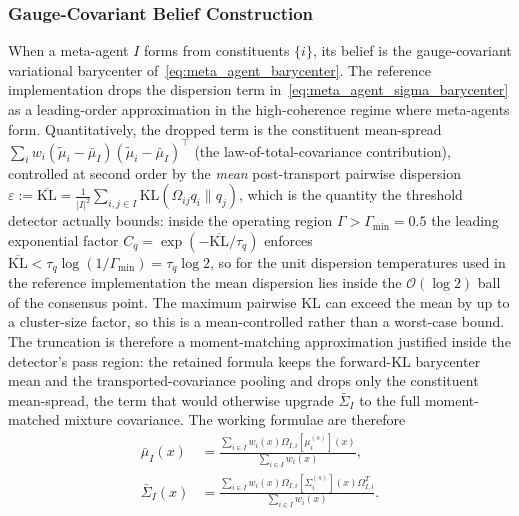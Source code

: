 \documentclass[11pt]{article}
\begin{document}
\subsubsection{Gauge-Covariant Belief Construction}
\label{sec:meta_agent_state_construction}

When a meta-agent $I$ forms from constituents $\{i\}$, its belief is the gauge-covariant variational barycenter of~\eqref{eq:meta_agent_barycenter}. The reference implementation drops the dispersion term in~\eqref{eq:meta_agent_sigma_barycenter} as a leading-order approximation in the high-coherence regime where meta-agents form. Quantitatively, the dropped term is the constituent mean-spread $\sum_i w_i (\tilde{\mu}_i - \bar{\mu}_I)(\tilde{\mu}_i - \bar{\mu}_I)^\top$ (the law-of-total-covariance contribution), controlled at second order by the \emph{mean} post-transport pairwise dispersion $\varepsilon := \overline{\mathrm{KL}} = \frac{1}{|I|^2}\sum_{i,j \in I} \mathrm{KL}(\Omega_{ij}q_i \| q_j)$, which is the quantity the threshold detector actually bounds: inside the operating region $\Gamma > \Gamma_{\min} = 0.5$ the leading exponential factor $C_q = \exp(-\overline{\mathrm{KL}}/\tau_q)$ enforces $\overline{\mathrm{KL}} < \tau_q \log(1/\Gamma_{\min}) = \tau_q \log 2$, so for the unit dispersion temperatures used in the reference implementation the mean dispersion lies inside the $\mathcal{O}(\log 2)$ ball of the consensus point. The maximum pairwise KL can exceed the mean by up to a cluster-size factor, so this is a mean-controlled rather than a worst-case bound. The truncation is therefore a moment-matching approximation justified inside the detector's pass region: the retained formula keeps the forward-KL barycenter mean and the transported-covariance pooling and drops only the constituent mean-spread, the term that would otherwise upgrade $\bar{\Sigma}_I$ to the full moment-matched mixture covariance. The working formulae are therefore
\begin{align}
\bar{\mu}_I(x) &= \frac{\sum_{i \in I} w_i(x)  \Omega_{I,i}[\mu_i^{(s)}](x)}{\sum_{i \in I} w_i(x)},
\label{eq:meta_agent_mu_impl}
\\
\bar{\Sigma}_I(x) &= \frac{\sum_{i \in I} w_i(x)  \Omega_{I,i}[\Sigma_i^{(s)}](x)  \Omega_{I,i}^T}{\sum_{i \in I} w_i(x)}.
\label{eq:meta_agent_sigma_impl}
\end{align}
\end{document}
